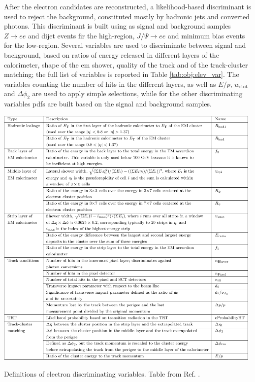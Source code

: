 After the electron candidates are reconstructed, a likelihood-based discriminant is used to reject the background, 
constituted mostly by hadronic jets and converted photons. 
This discriminant is built using as signal and background samples $Z\rightarrow e e$ and dijet events fir the
high-\et region, $J/\Psi \rightarrow e e$ and minimum bias events for the low-\et region.
Several variables are used to discriminate between signal and background, based on ratios of energy released in different layers of 
the calorimeter, shape of the \gls{em} shower, quality of the track and of the track-cluster matching; 
the full list of variables is reported in Table \ref{tab:obj:elev_var}.
The variables counting the number of hits in the different layers, as well as $E/p$, $w_\mathrm{stot}$ and 
$\Delta\phi_2$ are used to apply simple selections, while for the other discriminating variables \glspl{pdf} are built based
on the signal and background samples.

\begin{table}[h]
\begin{center}
    \includegraphics[width=0.985\textwidth]{figures/objects/ele_var_tab.pdf}  
\end{center}
 \caption{Definitions of electron discriminating variables. Table from Ref. \cite{ATLAS:2016iqc}.}
  \label{tab:obj:elev_var}
\end{table}

